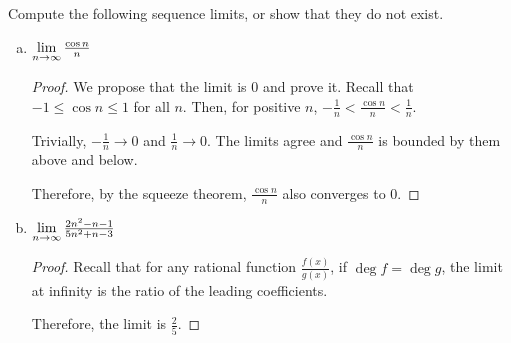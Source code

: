 \documentclass{agony}
\begin{document}
\question Compute the following sequence limits, or show that they do not exist.
\begin{enumerate}[(a)]
  \item $\lim\limits_{n\to\infty} \frac{\cos n}{n}$
        \begin{proof}
          We propose that the limit is 0 and prove it.
          Recall that $-1 \leq \cos n \leq 1$ for all $n$.
          Then, for positive $n$, $-\frac1n < \frac{\cos n}{n} < \frac1n$.

          Trivially, $-\frac1n \to 0$ and $\frac1n \to 0$.
          The limits agree and $\frac{\cos n}{n}$ is bounded by them above and below.

          Therefore, by the squeeze theorem, $\frac{\cos n}{n}$ also converges to 0.
        \end{proof}
  \item $\lim\limits_{n\to\infty} \frac{2n^2-n-1}{5n^2+n-3}$
        \begin{proof}
          Recall that for any rational function $\frac{f(x)}{g(x)}$, if $\deg f=\deg g$, the limit at infinity is the ratio of the leading coefficients.

          Therefore, the limit is $\frac{2}{5}$.
        \end{proof}
\end{enumerate}
\end{document}
